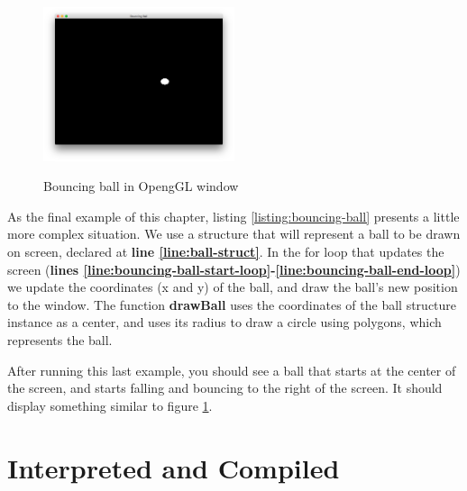 \documentclass[11pt,fleqn,openany]{book} %
\begin{document}
\begin{figure}
\caption{Bouncing ball in OpengGL window}
\centering
\includegraphics[width=0.5\textwidth]{img/bouncing-ball.png}
\label{figure:bouncing-ball}
\end{figure}

As the final example of this chapter, listing \ref{listing:bouncing-ball} presents a little more complex situation. We use a structure that will represent a ball to be drawn on screen, declared at \textbf{line \ref{line:ball-struct}}. In the for loop that updates the screen (\textbf{lines \ref{line:bouncing-ball-start-loop}-\ref{line:bouncing-ball-end-loop}}) we update the coordinates (x and y) of the ball, and draw the ball's new position to the window. The function \textbf{drawBall} uses the coordinates of the ball structure instance as a center, and uses its radius to draw a circle using polygons, which represents the ball.

After running this last example, you should see a ball that starts at the center of the screen, and starts falling and bouncing to the right of the screen. It should display something similar to figure \ref{figure:bouncing-ball}.


\chapter{Interpreted and Compiled}
\label{chapter:interpreted-and-compiled}
\end{document}
